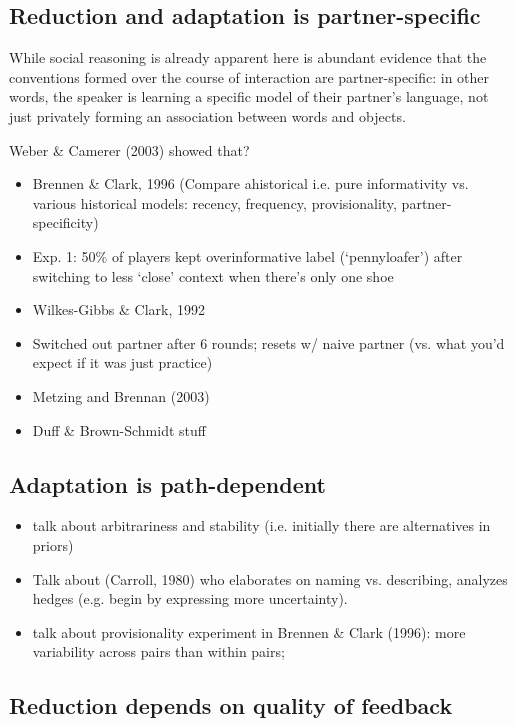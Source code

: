 \documentclass[11pt, floatsintext, man]{apa6}
\begin{document}
\subsection{Reduction and adaptation is partner-specific}

While social reasoning is already apparent here is abundant evidence that the conventions formed over the course of interaction are partner-specific: in other words, the speaker is learning a specific model of their partner's language, not just privately forming an association between words and objects. 

Weber \& Camerer (2003) showed that? 

\begin{itemize}
\item Brennen \& Clark, 1996 (Compare ahistorical i.e. pure informativity vs. various historical models: recency, frequency, provisionality, partner-specificity)
\item Exp. 1: 50\% of players kept overinformative label (`pennyloafer') after switching to less `close' context when there's only one shoe
\item Wilkes-Gibbs \& Clark, 1992
\item Switched out partner after 6 rounds; resets w/ naive partner (vs. what you'd expect if it was just practice)
\item Metzing and Brennan (2003)
\item Duff \& Brown-Schmidt stuff
\end{itemize}


\subsection{Adaptation is path-dependent}

\begin{itemize}

\item talk about arbitrariness and stability (i.e. initially there are alternatives in priors)
\item Talk about (Carroll, 1980) who elaborates on naming vs. describing, analyzes hedges (e.g. begin by expressing more uncertainty).
\item talk about provisionality experiment in Brennen \& Clark (1996): more variability across pairs than within pairs; 
\end{itemize}


\subsection{Reduction depends on quality of feedback}
\end{document}
